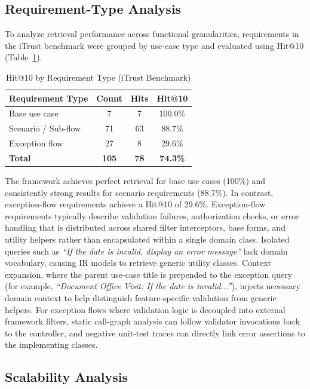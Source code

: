 \documentclass[conference]{IEEEtran}
\renewcommand{\arraystretch}{1.15}
\begin{document}
\subsection{Requirement-Type Analysis}

To analyze retrieval performance across functional granularities, requirements in the iTrust benchmark were grouped by use-case type and evaluated using Hit@10 (Table~\ref{tab:reqtype}).

\begin{table}[H]
\centering
\caption{Hit@10 by Requirement Type (iTrust Benchmark)}
\label{tab:reqtype}
\small
\renewcommand{\arraystretch}{1.1}
\begin{tabular}{@{}lccc@{}}
\toprule
\textbf{Requirement Type} & \textbf{Count} & \textbf{Hits} & \textbf{Hit@10} \\
\midrule
Base use case & 7 & 7 & 100.0\% \\
Scenario / Sub-flow & 71 & 63 & 88.7\% \\
Exception flow & 27 & 8 & 29.6\% \\
\midrule
\textbf{Total} & \textbf{105} & \textbf{78} & \textbf{74.3\%} \\
\bottomrule
\end{tabular}
\end{table}

The framework achieves perfect retrieval for base use cases (100\%) and consistently strong results for scenario requirements (88.7\%). In contrast, exception-flow requirements achieve a Hit@10 of 29.6\%. Exception-flow requirements typically describe validation failures, authorization checks, or error handling that is distributed across shared filter interceptors, base forms, and utility helpers rather than encapsulated within a single domain class. Isolated queries such as \textit{``If the date is invalid, display an error message''} lack domain vocabulary, causing IR models to retrieve generic utility classes. Context expansion, where the parent use-case title is prepended to the exception query (for example, \textit{``Document Office Visit: If the date is invalid...''}), injects necessary domain context to help distinguish feature-specific validation from generic helpers. For exception flows where validation logic is decoupled into external framework filters, static call-graph analysis can follow validator invocations back to the controller, and negative unit-test traces can directly link error assertions to the implementing classes.

\subsection{Scalability Analysis}
\end{document}

